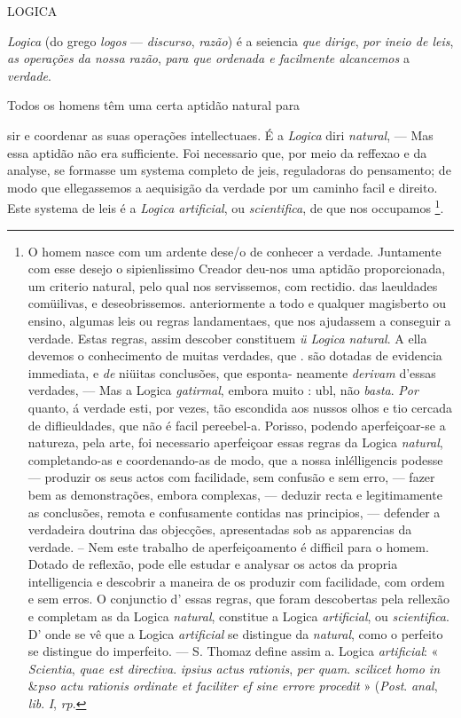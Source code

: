LOGICA


 
\emph{Logica} (do grego \emph{logos} --- \emph{discurso}, \emph{razão}) é a seiencia \emph{que dirige}, \emph{por ineio de leis}, \emph{as operações da nossa razão}, \emph{para que ordenada e facilmente alcancemos} a \emph{verdade}.

Todos os homens têm uma certa aptidão natural para

sir e coordenar as suas operações intellectuaes. É a \emph{Logica} diri \emph{natural}, --- Mas essa aptidão não era sufficiente. Foi necessario que, por meio da reffexao e da analyse, se formasse um systema completo de jeis, reguladoras do pensamento; de modo que ellegassemos a aequisigão da verdade por um caminho facil e direito. Este systema de leis é a \emph{Logica artificial}, ou \emph{scientifica}, de que nos occupamos \footnote{O homem nasce com um ardente dese/o de conhecer a verdade. Juntamente com esse desejo o sipienlissimo Creador deu-nos uma aptidão proporcionada, um criterio natural, pelo qual nos servissemos, com rectidio. das laeuldades comüilivas, e deseobrissemos. anteriormente a todo e qualquer magisberto ou ensino, algumas leis ou regras landamentaes, que nos ajudassem a conseguir a verdade. Estas regras, assim descober constituem \emph{ü Logica natural}. A ella devemos o conhecimento de muitas verdades, que . são dotadas de evidencia immediata, e \emph{de} niüitas conclusões, que esponta- \textbar{} neamente \emph{derivam} d'essas verdades, --- Mas a Logica \emph{gatirmal}, embora muito : ubl, não \emph{basta}. \emph{Por} quanto, á verdade esti, por vezes, tão escondida aos nussos olhos e tio cercada de diflieuldades, que não é facil pereebel-a. Porisso, podendo aperfeiçoar-se a natureza, pela arte, foi necessario aperfeiçoar essas regras da Logica \emph{natural}, completando-as e coordenando-as de modo, que a nossa inlélligencis podesse --- produzir os seus actos com facilidade, sem confusão e sem erro, --- fazer bem as demonstrações, embora complexas, --- deduzir recta e legitimamente as conclusões, remota e confusamente contidas nas principios, --- defender a verdadeira doutrina das objecções, apresentadas sob as apparencias da verdade. -- Nem este trabalho de aperfeiçoamento é difficil para o homem. Dotado de reflexão, pode elle estudar e analysar os actos da propria intelligencia e descobrir a maneira de os produzir com facilidade, com ordem e sem erros. O conjunctio d' essas regras, que foram descobertas pela rellexão e completam as da Logica \emph{natural}, constitue a Logica \emph{artificial}, ou \emph{scientifica}. D' onde se vê que a Logica \emph{artificial} se distingue da \emph{natural}, como o perfeito se distingue do imperfeito. --- S. Thomaz define assim a. Logica \emph{artificial}: « \emph{Scientia}, \emph{quae est directiva}. \emph{ipsius actus rationis}, \emph{per quam}. \emph{scilicet homo in} \&\emph{pso actu rationis ordinate et faciliter ef sine errore procedit} » (\emph{Post}. \emph{anal}, \emph{lib}. \emph{I}, \emph{rp}.}.

